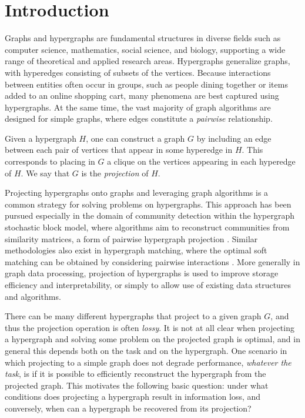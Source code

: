 \section{Introduction}

Graphs and hypergraphs are fundamental structures in diverse fields such as computer science, mathematics, social science, and biology, supporting a wide range of theoretical and applied research areas. 
Hypergraphs generalize graphs, with hyperedges consisting of subsets of the vertices.
Because interactions between entities often occur in groups, such as people dining together or items added to an online shopping cart, many phenomena are best captured using hypergraphs. At the same time, the vast majority of graph algorithms are designed for simple graphs, where edges constitute a \emph{pairwise} relationship.

Given a hypergraph $H$, one can construct a graph $G$ by including an edge between each pair of vertices that appear in some hyperedge in $H$. This corresponds to placing in $G$ a clique on the vertices appearing in each hyperedge of $H$. We say that $G$ is the \emph{projection} of $H$. 

Projecting hypergraphs onto graphs and leveraging graph algorithms is a common strategy for solving problems on hypergraphs. 
This approach has been pursued especially in the domain of community detection within the hypergraph stochastic block model, where algorithms aim to reconstruct communities from similarity matrices, a form of pairwise hypergraph projection
\cite{kim2018stochastic,cole2020exact,gaudio2023community}.
Similar methodologies also exist in hypergraph matching, where the optimal soft matching can be obtained by considering pairwise interactions \cite{zass2008probabilistic}. 
More generally in graph data processing, projection of hypergraphs is used to improve storage efficiency and interpretability, or simply to allow use of existing data structures and algorithms. 


There can be many different hypergraphs that project to a given graph $G$, and thus the projection operation is often \emph{lossy}. 
It is not at all clear when projecting a hypergraph and solving some problem on the projected graph is optimal, and in general this depends both on the task and on the hypergraph. One scenario in which projecting to a simple graph does not degrade performance, \emph{whatever the task}, is if it is possible to efficiently reconstruct the hypergraph from the projected graph. 
This motivates the following basic question: under what conditions does projecting a hypergraph result in information loss, and conversely, when can a hypergraph be recovered from its projection? 




